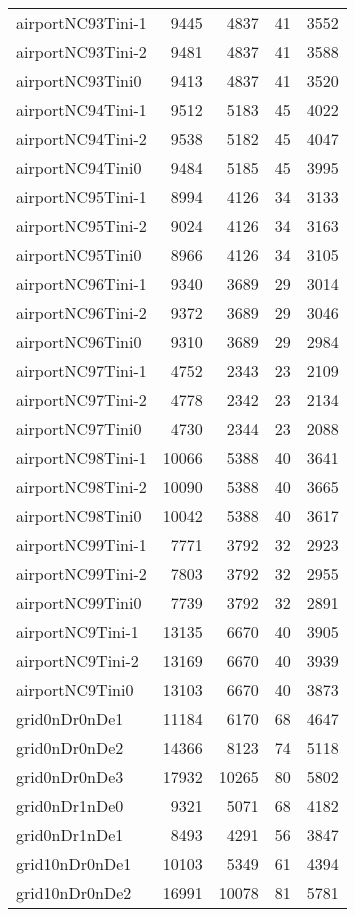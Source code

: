 \documentclass[../../../thesis.tex]{subfiles}
\begin{document}
\begin{longtable}{lrrrr}
airportNC93Tini-1 & 9445 & 4837 & 41 & 3552 \\
airportNC93Tini-2 & 9481 & 4837 & 41 & 3588 \\
airportNC93Tini0 & 9413 & 4837 & 41 & 3520 \\
airportNC94Tini-1 & 9512 & 5183 & 45 & 4022 \\
airportNC94Tini-2 & 9538 & 5182 & 45 & 4047 \\
airportNC94Tini0 & 9484 & 5185 & 45 & 3995 \\
airportNC95Tini-1 & 8994 & 4126 & 34 & 3133 \\
airportNC95Tini-2 & 9024 & 4126 & 34 & 3163 \\
airportNC95Tini0 & 8966 & 4126 & 34 & 3105 \\
airportNC96Tini-1 & 9340 & 3689 & 29 & 3014 \\
airportNC96Tini-2 & 9372 & 3689 & 29 & 3046 \\
airportNC96Tini0 & 9310 & 3689 & 29 & 2984 \\
airportNC97Tini-1 & 4752 & 2343 & 23 & 2109 \\
airportNC97Tini-2 & 4778 & 2342 & 23 & 2134 \\
airportNC97Tini0 & 4730 & 2344 & 23 & 2088 \\
airportNC98Tini-1 & 10066 & 5388 & 40 & 3641 \\
airportNC98Tini-2 & 10090 & 5388 & 40 & 3665 \\
airportNC98Tini0 & 10042 & 5388 & 40 & 3617 \\
airportNC99Tini-1 & 7771 & 3792 & 32 & 2923 \\
airportNC99Tini-2 & 7803 & 3792 & 32 & 2955 \\
airportNC99Tini0 & 7739 & 3792 & 32 & 2891 \\
airportNC9Tini-1 & 13135 & 6670 & 40 & 3905 \\
airportNC9Tini-2 & 13169 & 6670 & 40 & 3939 \\
airportNC9Tini0 & 13103 & 6670 & 40 & 3873 \\
grid0nDr0nDe1 & 11184 & 6170 & 68 & 4647 \\
grid0nDr0nDe2 & 14366 & 8123 & 74 & 5118 \\
grid0nDr0nDe3 & 17932 & 10265 & 80 & 5802 \\
grid0nDr1nDe0 & 9321 & 5071 & 68 & 4182 \\
grid0nDr1nDe1 & 8493 & 4291 & 56 & 3847 \\
grid10nDr0nDe1 & 10103 & 5349 & 61 & 4394 \\
grid10nDr0nDe2 & 16991 & 10078 & 81 & 5781 \\

\end{longtable}
\end{document}
